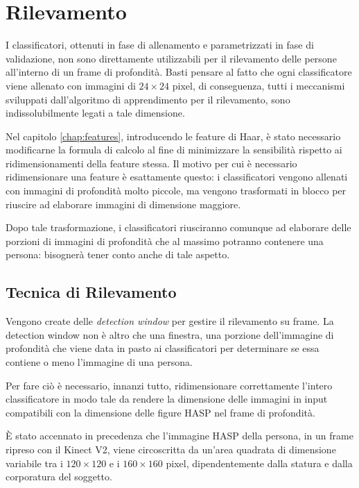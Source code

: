 
\chapter{Rilevamento}
\label{chap:rilevamento}
    I classificatori, ottenuti in fase di allenamento e parametrizzati in fase di validazione, non sono direttamente utilizzabili per il rilevamento delle persone all'interno di un frame di profondità.
    Basti pensare al fatto che ogni classificatore viene allenato con immagini di $24 \times 24$ pixel, di conseguenza, tutti i meccanismi sviluppati dall'algoritmo di apprendimento per il rilevamento, sono indissolubilmente legati a tale dimensione.

    Nel capitolo \ref{chap:features}, introducendo le feature di Haar, è stato necessario modificarne la formula di calcolo al fine di minimizzare la sensibilità rispetto ai ridimensionamenti della feature stessa.
    Il motivo per cui è necessario ridimensionare una feature è esattamente questo: i classificatori vengono allenati con immagini di profondità molto piccole, ma vengono trasformati in blocco per riuscire ad elaborare immagini di dimensione maggiore.

    Dopo tale trasformazione, i classificatori riusciranno comunque ad elaborare delle porzioni di immagini di profondità che al massimo potranno contenere una persona: bisognerà tener conto anche di tale aspetto.

    \section{Tecnica di Rilevamento}
    \label{sec:detection_tecnique}
        Vengono create delle \emph{detection window} per gestire il rilevamento su frame.
        La detection window non è altro che una finestra, una porzione dell'immagine di profondità che viene data in pasto ai classificatori per determinare se essa contiene o meno l'immagine di una persona.

        Per fare ciò è necessario, innanzi tutto, ridimensionare correttamente l'intero classificatore in modo tale da rendere la dimensione delle immagini in input compatibili con la dimensione delle figure HASP nel frame di profondità.

        È stato accennato in precedenza che l'immagine HASP della persona, in un frame ripreso con il Kinect V2, viene circoscritta da un'area quadrata di dimensione variabile tra i $120 \times 120$ e i $160 \times 160$ pixel, dipendentemente dalla statura e dalla corporatura del soggetto.

